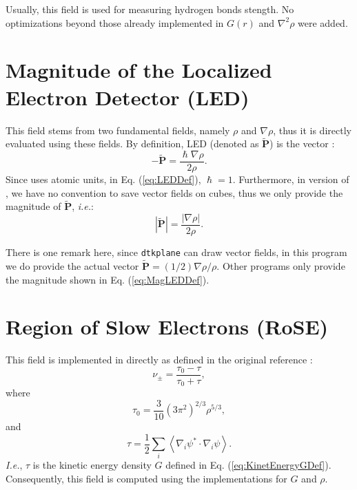 Usually, this field is used for measuring hydrogen bonds stength.
No optimizations beyond those already implemented in $G(r)$ and $\nabla^2\rho$
were added.

\section{Magnitude of the Localized Electron Detector (LED)}
This field stems from two fundamental fields, namely $\rho$ and $\nabla\rho$, thus
it is directly evaluated using these fields. By definition, LED (denoted as $\tilde{\boldsymbol P}$) is the vector
\cite{bib:bohorquez2010a}:
%
\begin{equation}\label{eq:LEDDef}
-\tilde{\boldsymbol P}=\frac{\hslash\nabla\rho}{2\rho}.
\end{equation}
%
Since \DTK{} uses atomic units, in Eq. (\ref{eq:LEDDef}), $\hslash=1$.
Furthermore, in version \dtkversion{} of \DTK, we have no convention to save vector fields on cubes,
thus we only provide the magnitude of $\tilde{\boldsymbol P}$, \textit{i.e.}:
%
\begin{equation}\label{eq:MagLEDDef}
|\tilde{\boldsymbol P}|=\frac{|\nabla\rho|}{2\rho}.
\end{equation}
%

There is one remark here, since \texttt{dtkplane} can draw vector fields,
in this program we do provide the actual vector $\tilde{\boldsymbol P}=(1/2)\nabla\rho/\rho$.
Other programs only provide the magnitude shown in Eq. (\ref{eq:MagLEDDef}).

\section{Region of Slow Electrons (RoSE)}
This field is implemented in \DTK{} directly as defined in the original reference \cite{jacobsen2013}:
%
\begin{equation}%
  \nu_{\pm}=\frac{\tau_0-\tau}{\tau_0+\tau},
\end{equation}
%
where
%
\begin{equation}%
  \tau_0=\frac{3}{10}\left( 3\pi^2 \right)^{2/3}\rho^{5/3},
\end{equation}
%
and
%
\begin{equation}%
  \tau=\frac{1}{2}\sum_i\left<\nabla_i\psi^*\cdot\nabla_i\psi\right>.
\end{equation}
%
\textit{I.e.}, $\tau$ is the kinetic energy density $G$ defined in Eq. (\ref{eq:KinetEnergyGDef}).
Consequently, this field is computed using the implementations for $G$ and $\rho$.

